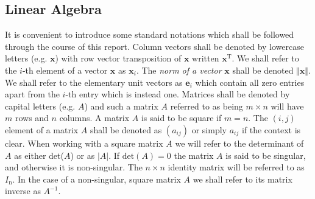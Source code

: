 \documentclass[10pt,a4paper]{article}
\numberwithin{equation}{section}
\theoremstyle{plain}
\theoremstyle{definition}
\newcommand{\vect}[1]{\textbf{#1}}
\theoremstyle{own}
\begin{document}
\subsection{Linear Algebra}
It is convenient to introduce some standard notations which shall be followed through the course of this report. Column vectors shall be denoted by lowercase letters (e.g. $\vect{x}$) with row vector transposition of $\vect{x}$ written $\vect{x}^\text{T}$. We shall refer to the $i$-th element of a vector $\vect{x}$ as $\vect{x}_i$. The \textit{norm of a vector} $\vect{x}$ shall be denoted $\Vert \vect{x} \Vert$. We shall refer to the elementary unit vectors as $\textbf{e}_i$ which contain all zero entries apart from the $i$-th entry which is instead one.
Matrices shall be denoted by capital letters (e.g. $A$) and such a matrix $A$ referred to as being $m \times n$ will have $m$ rows and $n$ columns. A matrix $A$ is said to be square if $m = n$. The $(i,j)$ element of a matrix $A$ shall be denoted as $(a_{ij})$ or simply $a_{ij}$ if the context is clear. When working with a square matrix $A$ we will refer to the determinant of $A$ as either det($A$) or as $\left|A\right|$. If $\text{det}(A)=0$ the matrix $A$ is said to be singular, and otherwise it is non-singular. The $n\times n$ identity matrix will be referred to as $I_\text{n}$. In the case of a non-singular, square matrix $A$ we shall refer to its matrix inverse as $A^{-1}$.
\end{document}
